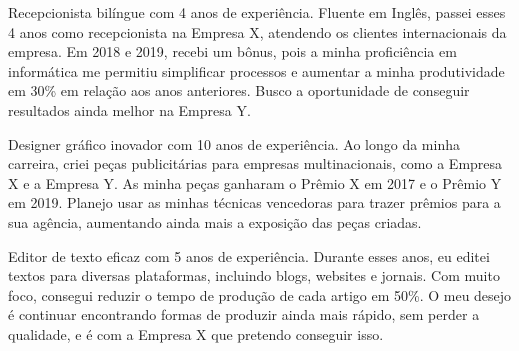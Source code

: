 \begin{commentF}
  Recepcionista bilíngue com 4 anos de experiência. Fluente em Inglês, passei esses 4 anos como recepcionista na Empresa X, atendendo os clientes internacionais da empresa. Em 2018 e 2019, recebi um bônus, pois a minha proficiência em informática me permitiu simplificar processos e aumentar a minha produtividade em 30\% em relação aos anos anteriores. Busco a oportunidade de conseguir resultados ainda melhor na Empresa Y.
\end{commentF}
\begin{commentG}
  Designer gráfico inovador com 10 anos de experiência. Ao longo da minha carreira, criei peças publicitárias para empresas multinacionais, como a Empresa X e a Empresa Y. As minha peças ganharam o Prêmio X em 2017 e o Prêmio Y em 2019. Planejo usar as minhas técnicas vencedoras para trazer prêmios para a sua agência, aumentando ainda mais a exposição das peças criadas.
\end{commentG}
\begin{commentH}
  Editor de texto eficaz com 5 anos de experiência. Durante esses anos, eu editei textos para diversas plataformas, incluindo blogs, websites e jornais. Com muito foco, consegui reduzir o tempo de produção de cada artigo em 50\%. O meu desejo é continuar encontrando formas de produzir ainda mais rápido, sem perder a qualidade, e é com a Empresa X que pretendo conseguir isso.
\end{commentH}
\begin{commentI}
%

\end{commentI}
